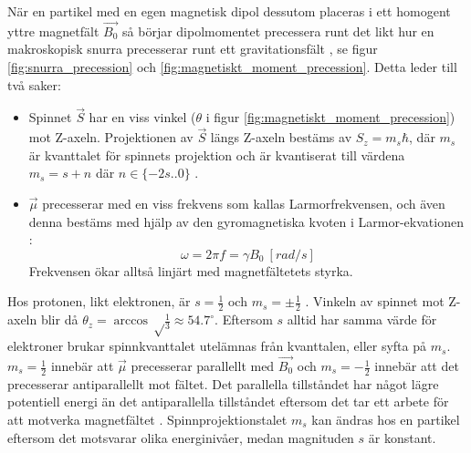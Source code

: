 \documentclass[11pt, a4paper]{article}
\begin{document}
När en partikel med en egen magnetisk dipol dessutom placeras i ett homogent yttre magnetfält $\vec{B_0}$ så börjar dipolmomentet precessera runt det likt hur en makroskopisk snurra precesserar runt ett gravitationsfält \parencite{larmor_precession}, se figur \ref{fig:snurra_precession} och \ref{fig:magnetiskt_moment_precession}. Detta leder till två saker:
\begin{itemize}
	\item Spinnet $\vec{S}$ har en viss vinkel ($\theta$ i figur \ref{fig:magnetiskt_moment_precession}) mot Z-axeln. Projektionen av $\vec{S}$ längs Z-axeln bestäms av $S_z=m_s\hbar$, där $m_s$ är kvanttalet för spinnets projektion och är kvantiserat till värdena $m_s=s+n$ där $n\in\{-2s..0\}$ \parencite{university_physics}.
	\item $\vec{\mu}$ precesserar med en viss frekvens som kallas Larmorfrekvensen, och även denna bestäms med hjälp av den gyromagnetiska kvoten i Larmor-ekvationen \parencite{mri_lärobok}:
	\begin{equation}\label{eq:larmor}
		\omega=2\pi f=\gamma B_0\:[\si{rad/s}]
	\end{equation}
	Frekvensen ökar alltså linjärt med magnetfältetets styrka.
\end{itemize}

Hos protonen, likt elektronen, är $s=\frac{1}{2}$ och $m_s=\pm\frac{1}{2}$ \parencite{college_physics}. Vinkeln av spinnet mot Z-axeln blir då $\theta_z=\arccos\sqrt\frac{1}{3}\approx54.7^\circ$. Eftersom $s$ alltid har samma värde för elektroner brukar spinnkvanttalet utelämnas från kvanttalen, eller syfta på $m_s$. $m_s=\frac{1}{2}$ innebär att $\vec{\mu}$ precesserar parallellt med $\vec{B_0}$ och $m_s=-\frac{1}{2}$ innebär att det precesserar antiparallellt mot fältet. Det parallella tillståndet har något lägre potentiell energi än det antiparallella tillståndet eftersom det tar ett arbete för att motverka magnetfältet \parencite{electron_spin}. Spinnprojektionstalet $m_s$ kan ändras hos en partikel eftersom det motsvarar olika energinivåer, medan magnituden $s$ är konstant. 
\end{document}
